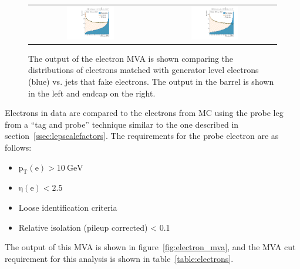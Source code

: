 \begin{figure}[!htb]
  \begin{center}
    \begin{tabular}{cc}
      \includegraphics[width=0.4\textwidth]{evtsel/figs/MVA_output_EB.pdf} &
      \includegraphics[width=0.4\textwidth]{evtsel/figs/MVA_output_EE.pdf} \\      
    \end{tabular}
    \caption{
      \label{fig:electron_mva_output}
      The output of the electron MVA is shown comparing the distributions of electrons matched
      with generator level electrons (blue) vs. jets that fake electrons.
      The output in the barrel is shown in the left and endcap on the right.
    }
  \end{center}
\end{figure}
  
Electrons in data are compared to the electrons from MC using the probe leg from a
``tag and probe'' technique similar to the one described in section~\ref{ssec:lepscalefactors}.
The requirements for the probe electron are as follows:
\begin{itemize}
\item $\mathrm{p_{T}(e) > 10~GeV}$
\item $\mathrm{\eta(e) < 2.5}$
\item Loose identification criteria
\item Relative isolation (pileup corrected) < 0.1
\end{itemize}
The output of this MVA is shown in figure~\ref{fig:electron_mva},
and the MVA cut requirement for this analysis is shown in table~\ref{table:electrons}.
  
